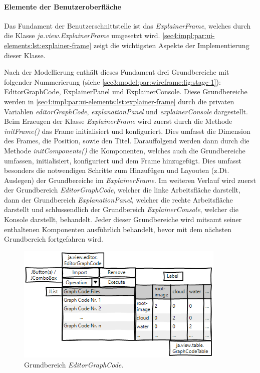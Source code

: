 \paragraph{Elemente der Benutzeroberfläche}
\label{sec4:impl:par:ui-elements}

Das Fundament der Benutzerschnittstelle ist das \textit{ExplainerFrame}, welches durch die Klasse \textit{ja.view.ExplainerFrame} umgesetzt wird.
\cref{sec4:impl:par:ui-elements:lst:explainer-frame} zeigt die wichtigsten Aspekte der Implementierung dieser Klasse.



Nach der Modellierung enthält dieses Fundament drei Grundbereiche mit folgender Nummerierung (siehe \cref{sec3:model:par:wireframe:fig:stage-1}):  EditorGraphCode,  ExplainerPanel und  ExplainerConsole.
Diese Grundbereiche werden in \cref{sec4:impl:par:ui-elements:lst:explainer-frame} durch die privaten Variablen \textit{editorGraphCode}, \textit{explanationPanel} und \textit{explainerConsole} dargestellt.
Beim Erzeugen der Klasse \textit{ExplainerFrame} wird zuerst durch die Methode \textit{initFrame()} das Frame initialisiert und konfiguriert.
Dies umfasst die Dimension des Frames, die Position, sowie den Titel.
Darauffolgend werden dann durch die Methode \textit{initComponents()} die Komponenten, welches auch die Grundbereiche umfassen, initialisiert, konfiguriert und dem Frame hinzugefügt.
Dies umfasst besonders die notwendigen Schritte zum Hinzufügen und Layouten (z.Dt. Auslegen) der Grundbereiche im \textit{ExplainerFrame}.
Im weiteren Verlauf wird zuerst der Grundbereich \textit{EditorGraphCode}, welcher die linke Arbeitsfläche darstellt, dann der Grundbereich \textit{ExplanationPanel}, welcher die rechte Arbeitsfläche darstellt und schlussendlich der Grundbereich \textit{ExplainerConsole}, welcher die Konsole darstellt, behandelt.
Jeder dieser Grundbereiche wird mitsamt seiner enthaltenen Komponenten ausführlich behandelt, bevor mit dem nächsten Grundbereich fortgefahren wird.

\begin{figure}[!ht]
  \includegraphics[width=10cm]{chapter/chapter_4/wireframe-impl-left}
  \caption{Grundbereich \textit{EditorGraphCode}.}
  \label{sec4:impl:subsubsec:ui:fig:wireframe-editor-graph-code}
\end{figure}

